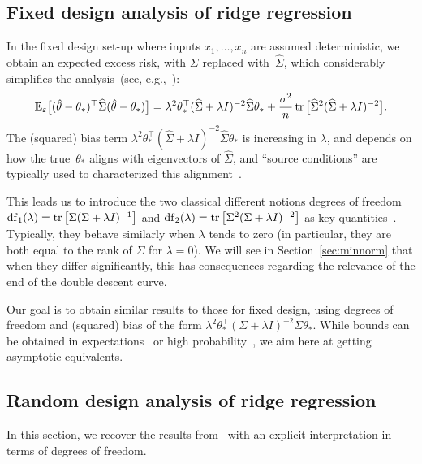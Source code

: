 \documentclass[11pt]{article}
\newcommand{\tr}{\mathop{ \rm tr}}
\newcommand{\idm}{I}
\newcommand{\mysec}[1]{Section~\ref{sec:#1}}
\def \hS{ \widehat{ \Sigma} }
\def \S{  { \Sigma} }
\def \E{{\mathbb E}}
\begin{document}
\subsection{Fixed design analysis of ridge regression}
In the fixed design set-up where inputs $x_1,\dots,x_n$ are assumed deterministic, we obtain an expected excess risk, with $\S$ replaced with~$\hS$, which considerably simplifies the analysis~(see, e.g.,~\cite{hsu2012random}):
$$
\E_\varepsilon \big[ ( \hat{\theta} - \theta_\ast)^\top \hS 
( \hat{\theta} - \theta_\ast) \big]=
\lambda^2 \theta_\ast^\top ( \hS+ \lambda \idm )^{-2}   \hS\theta_\ast + \frac{\sigma^2}{n} \tr \big[   \hS^2 (\hS +\lambda \idm)^{-2} \big].
$$
The (squared) bias term $\lambda^2 \theta_\ast^\top ( \hS+ \lambda \idm )^{-2}   \hS\theta_\ast$ is increasing in $\lambda$, and depends on how the true~$\theta_\ast$ aligns with eigenvectors of $\hS$, and ``source conditions'' are typically  used to characterized this alignment~\cite{FCM:Caponetto+Vito:2007}.


This leads us to introduce the two classical different notions degrees of freedom ${\rm df}_1(\lambda) = \tr\big[ \S ( \S + \lambda\idm)^{-1} \big]$ and ${\rm df}_2(\lambda) =  \tr\big[ \S^2 ( \S + \lambda\idm)^{-2} \big]$ as key quantities~\cite{hsu2012random}. Typically, they behave similarly when $\lambda$ tends to zero (in particular, they are both equal to the rank of $\Sigma$ for $\lambda=0$). We will see in \mysec{minnorm} that when they differ significantly, this has consequences regarding the relevance of the end of the double descent curve.

Our goal is to obtain similar results to those for fixed design, using degrees of freedom and (squared) bias of the form $\lambda^2 \theta_\ast^\top ( \S+ \lambda \idm )^{-2}   \S\theta_\ast $. While bounds can be obtained in expectations~\cite{mourtada2022elementary} or high probability~\cite{FCM:Caponetto+Vito:2007}, we aim here at getting asymptotic equivalents.

\subsection{Random design analysis of ridge regression}
In this section, we recover the results from~\cite{dobriban2018high,mourtada2022elementary,bartlett_montanari_rakhlin_2021} with an explicit interpretation in terms of degrees of freedom.
\end{document}
